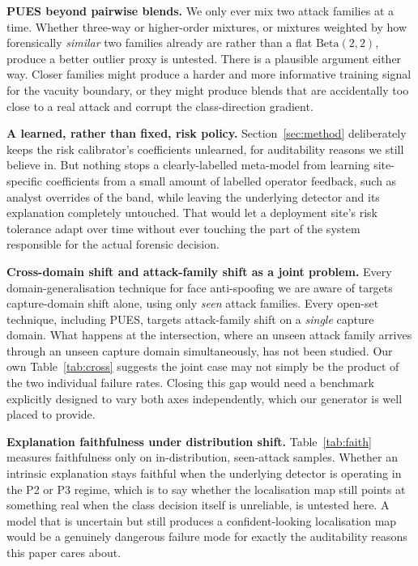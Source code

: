 \documentclass[conference]{IEEEtran}
\begin{document}
\textbf{PUES beyond pairwise blends.} We only ever mix two attack families at a time.
Whether three-way or higher-order mixtures, or mixtures weighted by how forensically
\emph{similar} two families already are rather than a flat $\mathrm{Beta}(2,2)$,
produce a better outlier proxy is untested. There is a plausible argument either way.
Closer families might produce a harder and more informative training signal for the
vacuity boundary, or they might produce blends that are accidentally too close to a
real attack and corrupt the class-direction gradient.

\textbf{A learned, rather than fixed, risk policy.} Section~\ref{sec:method}
deliberately keeps the risk calibrator's coefficients unlearned, for auditability
reasons we still believe in. But nothing stops a clearly-labelled meta-model from
learning site-specific coefficients from a small amount of labelled operator
feedback, such as analyst overrides of the band, while leaving the underlying
detector and its explanation completely untouched. That would let a deployment site's
risk tolerance adapt over time without ever touching the part of the system
responsible for the actual forensic decision.

\textbf{Cross-domain shift and attack-family shift as a joint problem.} Every
domain-generalisation technique for face anti-spoofing we are aware of
\cite{wang2022ssan,shao2019mada,jia2020ssdg} targets capture-domain shift alone,
using only \emph{seen} attack families. Every open-set technique, including PUES,
targets attack-family shift on a \emph{single} capture domain. What happens at the
intersection, where an unseen attack family arrives through an unseen capture domain
simultaneously, has not been studied. Our own Table~\ref{tab:cross} suggests the joint
case may not simply be the product of the two individual failure rates. Closing this
gap would need a benchmark explicitly designed to vary both axes independently, which
our generator is well placed to provide.

\textbf{Explanation faithfulness under distribution shift.} Table~\ref{tab:faith}
measures faithfulness only on in-distribution, seen-attack samples. Whether an
intrinsic explanation stays faithful when the underlying detector is operating in the
P2 or P3 regime, which is to say whether the localisation map still points at
something real when the class decision itself is unreliable, is untested here. A
model that is uncertain but still produces a confident-looking localisation map would
be a genuinely dangerous failure mode for exactly the auditability reasons this paper
cares about.
\end{document}
